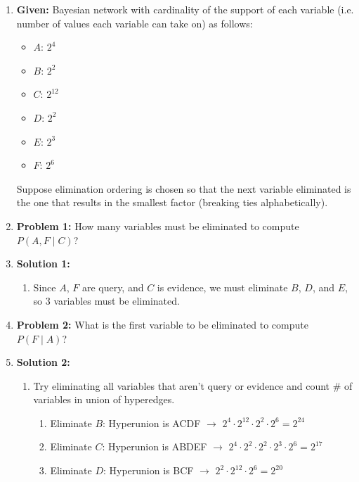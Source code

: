 \begin{example}
    \begin{enumerate}
        \item \textbf{Given:} Bayesian network 
        with cardinality of the support of each variable (i.e. number of values each variable can take on) as follows:
        \begin{itemize}
            \item $A$: $2^4$
            \item $B$: $2^2$
            \item $C$: $2^{12}$
            \item $D$: $2^2$
            \item $E$: $2^3$ 
            \item $F$: $2^6$
        \end{itemize}
        Suppose elimination ordering is chosen so that the next variable eliminated is the one that results in the smallest factor (breaking ties alphabetically).
        \item \textbf{Problem 1:} How many variables must be eliminated to compute $P(A,F \mid C)$?
        \item \textbf{Solution 1:}
        \begin{enumerate}
            \item Since $A$, $F$ are query, and $C$ is evidence, we must eliminate $B$, $D$, and $E$, so 3 variables must be eliminated.
        \end{enumerate}
        \item \textbf{Problem 2:} What is the first variable to be eliminated to compute $P(F \mid A)$? 
        \item \textbf{Solution 2:}
        \begin{enumerate}
            \item Try eliminating all variables that aren't query or evidence and count \# of variables in union of hyperedges.
            \begin{enumerate}
                \item Eliminate $B$: Hyperunion is ACDF $\rightarrow$ $2^4 \cdot 2^{12} \cdot 2^2 \cdot 2^6 = 2^{24}$
                \item Eliminate $C$: Hyperunion is ABDEF $\rightarrow$ $2^4 \cdot 2^2 \cdot 2^2 \cdot 2^3 \cdot 2^6 = 2^{17}$
                \item Eliminate $D$: Hyperunion is BCF $\rightarrow$ $2^2 \cdot 2^{12} \cdot 2^6 = 2^{20}$

\end{enumerate}
\end{enumerate}
\end{enumerate}
\end{example}
